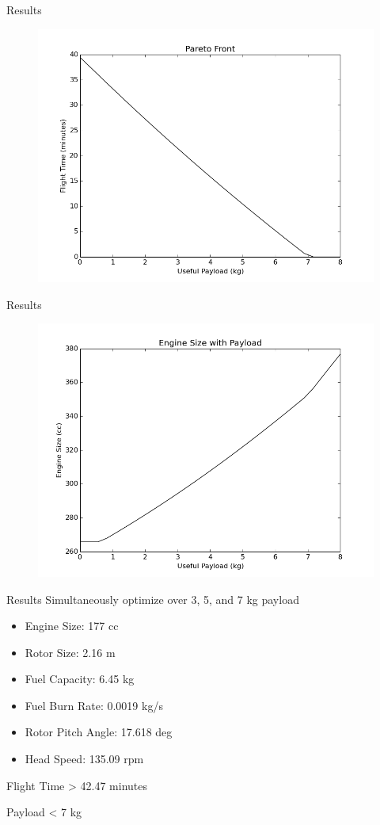 \documentclass{beamer}
\begin{document}
\begin{frame}{Results}
	\begin{figure}
		\begin{center}
			\includegraphics[width=.70\textwidth]{../pareto_front.png}
			\label{fig:pareto}
		\end{center}
	\end{figure}
\end{frame}

\begin{frame}{Results}
	\begin{figure}
		\begin{center}
			\includegraphics[width=.70\textwidth]{../engine_size_vs_payload.png}
			\label{fig:pareto}
		\end{center}
	\end{figure}
\end{frame}

\begin{frame}{Results}
	Simultaneously optimize over 3, 5, and 7 kg payload
	\begin{itemize}
		\item{Engine Size: 177 cc} 
		\item{Rotor Size: 2.16 m}
		\item{Fuel Capacity: 6.45 kg}
		\item{Fuel Burn Rate: 0.0019 kg/s}
		\item{Rotor Pitch Angle: 17.618 deg}
		\item{Head Speed: 135.09 rpm}
	\end{itemize}
	
	Flight Time > 42.47 minutes
	
	Payload < 7 kg
\end{frame}
\end{document}
